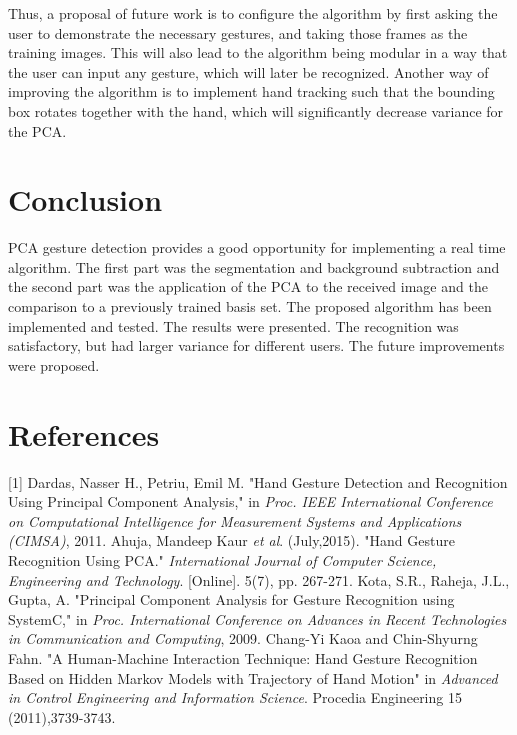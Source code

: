 \documentclass[12pt]{report}
\begin{document}
\newline
Thus, a proposal of future work is to configure the algorithm by first asking the user to demonstrate the necessary gestures, and taking those frames as the training images. This will also lead to the algorithm being modular in a way that the user can input any gesture, which will later be recognized. Another way of improving the algorithm is to implement hand tracking such that the bounding box rotates together with the hand, which will significantly decrease variance for the PCA. 

\section*{Conclusion}
PCA gesture detection provides a good opportunity for implementing a real time algorithm. The first part was the segmentation and background subtraction and the second part was the application of the PCA to the received image and the comparison to a previously trained basis set. The proposed algorithm has been implemented and tested. The results were presented. The recognition was satisfactory, but had larger variance for different users. The future improvements were proposed. 



\newpage
\section*{References}

[1] Dardas, Nasser H., Petriu, Emil M. "Hand Gesture Detection and Recognition Using Principal Component Analysis," in \textit{Proc. IEEE International Conference on Computational Intelligence for Measurement Systems and Applications (CIMSA)}, 2011.
\newline
\newline
[2] Ahuja, Mandeep Kaur \textit{et al}. (July,2015). "Hand Gesture Recognition Using PCA." \textit{International Journal of Computer Science, Engineering and Technology}. [Online]. 5(7), pp. 267-271.
\newline
\newline
[3] Kota, S.R., Raheja, J.L., Gupta, A. "Principal Component Analysis for Gesture Recognition using SystemC," in \textit{Proc. International Conference on Advances in Recent Technologies in Communication and Computing}, 2009.
\newline
\newline
[4] Chang-Yi Kaoa and Chin-Shyurng Fahn. "A Human-Machine Interaction Technique: Hand Gesture
Recognition Based on Hidden Markov Models with Trajectory of Hand Motion" in \textit{Advanced in Control Engineering and Information Science}. Procedia Engineering 15 (2011),3739-3743.
\end{document}
